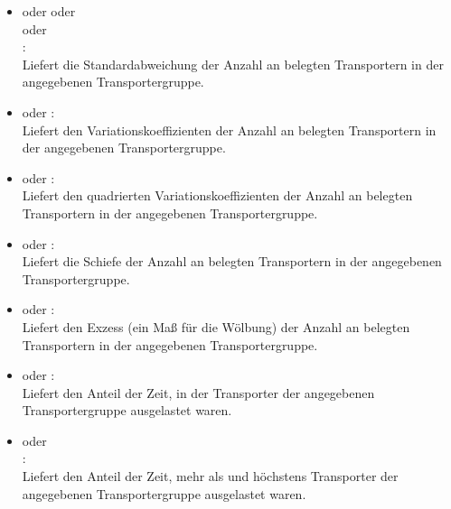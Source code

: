\begin{itemize}
\item
{} oder  oder\\
 oder\\
:\\
Liefert die Standardabweichung der Anzahl an belegten Transportern in der angegebenen Transportergruppe.
  
\item
{} oder :\\
Liefert den Variationskoeffizienten der Anzahl an belegten Transportern in der angegebenen Transportergruppe.
  
\item
{} oder :\\
Liefert den quadrierten Variationskoeffizienten der Anzahl an belegten Transportern in der angegebenen Transportergruppe.

\item
{} oder :\\
Liefert die Schiefe der Anzahl an belegten Transportern in der angegebenen Transportergruppe.

\item
{} oder :\\
Liefert den Exzess (ein Maß für die Wölbung) der Anzahl an belegten Transportern in der angegebenen Transportergruppe.
  
\item
{} oder :\\
Liefert den Anteil der Zeit, in der  Transporter der angegebenen Transportergruppe ausgelastet waren.
  
\item
{} oder\\
:\\
Liefert den Anteil der Zeit, mehr als  und höchstens  Transporter der angegebenen Transportergruppe ausgelastet waren.

\end{itemize}



